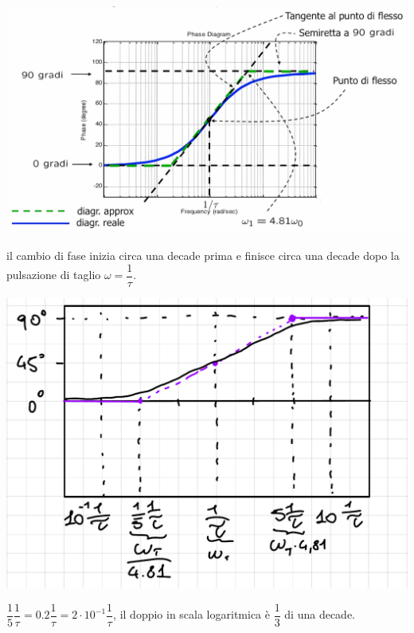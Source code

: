 \documentclass{article}
\numberwithin{equation}{subsection}
\begin{document}
\begin{center}
    \includegraphics[scale=0.125]{Images/Diagramma_zero_reale_negativo_3.png}
\end{center}
il cambio di fase inizia circa una decade prima e finisce circa una decade dopo la pulsazione di taglio $\omega = \dfrac{1}{\tau}$.
\begin{center}
    \includegraphics[scale=0.2]{Images/Diagramma_zero_reale_negativo_4.png}
\end{center}
$\dfrac{1}{5} \dfrac{1}{\tau} = 0.2 \dfrac{1}{\tau} = 2 \cdot 10^{-1} \dfrac{1}{\tau}$, il doppio in scala logaritmica è $\dfrac{1}{3}$ di una decade.
\end{document}
